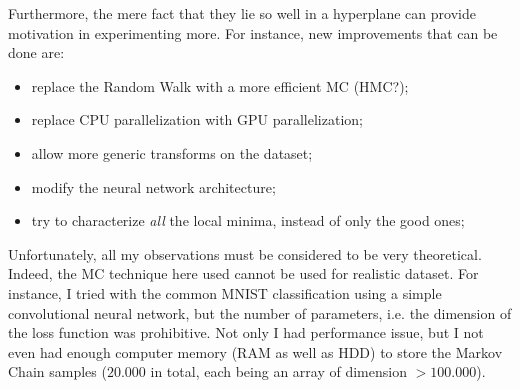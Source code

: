 \documentclass{article}
\begin{document}
Furthermore, the mere fact that they lie so well in a hyperplane
can provide motivation in experimenting more.
For instance, new improvements that can be done are:
\begin{itemize}
	\item replace the Random Walk with a more efficient MC (HMC?);
	\item replace CPU parallelization with GPU parallelization;
	\item allow more generic transforms on the dataset;
	\item modify the neural network architecture;
	\item try to characterize \emph{all} the local minima,
		instead of only the good ones;
\end{itemize}

Unfortunately, all my observations must be considered to be 
very theoretical.
Indeed, the MC technique here used cannot be used for realistic dataset. 
For instance, I tried with the common MNIST classification
using a simple convolutional neural network, but the number
of parameters, i.e. the dimension of the loss function
was prohibitive. Not only I had performance issue,
but I not even had enough computer memory (RAM as well as
HDD) to store the Markov Chain samples ($20.000$ in total,
each being an array of dimension $> 100.000$).
\end{document}
